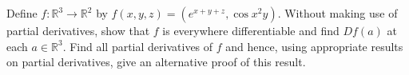 Define $f:\mathbb R^3\to\mathbb R^2$ by $f(x,y,z)=(e^{x+y+z},\cos{x^2}y)$. Without making use of partial derivatives, show that $f$ is everywhere differentiable and find $Df(a)$ at each $a\in\mathbb R^3$. Find all partial derivatives of $f$ and hence, using appropriate results on partial derivatives, give an alternative proof of this result.
